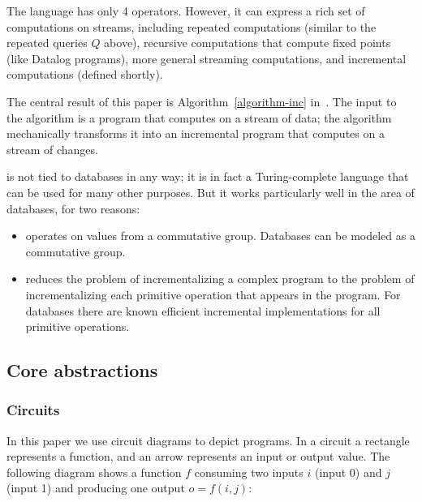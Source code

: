 The \dbsp language has only 4 operators.  However, it can express a
rich set of computations on streams, including repeated computations
(similar to the repeated queries $Q$ above), recursive computations
that compute fixed points (like Datalog programs), more general
streaming computations, and incremental computations (defined
shortly).

The central result of this paper is Algorithm~\ref{algorithm-inc}
in~.  The input to the algorithm is a \dbsp
program that computes on a stream of data; the algorithm mechanically
transforms it into an incremental \dbsp program that computes on a
stream of changes.

\dbsp is not tied to databases in any way; it is in fact a
Turing-complete language that can be used for many other purposes.
But it works particularly well in the area of databases, for two
reasons:

\begin{itemize}[nosep, leftmargin=0pt, itemindent=0.5cm]
  \item \dbsp operates on values from a commutative group.  Databases
    can be modeled as a commutative group.
  \item \dbsp reduces the problem of incrementalizing a complex
    program to the problem of incrementalizing each primitive
    operation that appears in the program.  For databases there are
    known efficient incremental implementations for all primitive
    operations.
\end{itemize}

\subsection{Core abstractions}

\subsubsection{Circuits}

In this paper we use circuit diagrams to depict programs.  In a
circuit a rectangle represents a function, and an arrow represents an
input or output value.  The following diagram shows a function $f$
consuming two inputs $i$ (input 0) and $j$ (input 1) and producing one
output $o = f(i, j)$:
%
\begin{center}
\end{center}

